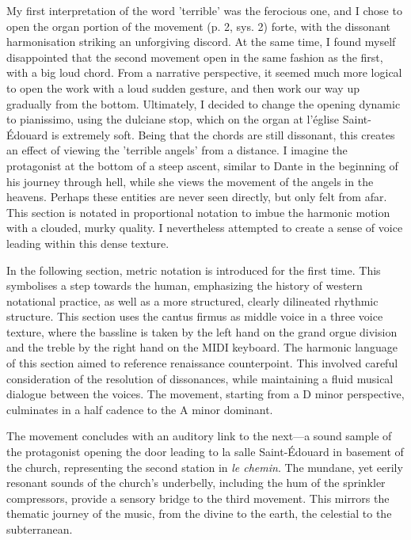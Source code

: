 \documentclass[12pt,twoside,maitrise]{dms_ks}
\theoremstyle{definition}
\begin{document}

My first interpretation of the word 'terrible' was the ferocious one, and I chose to open the organ portion of the movement (p. 2, sys. 2) forte, with the dissonant harmonisation striking an unforgiving discord. 
At the same time, I found myself disappointed that the second movement open in the same fashion as the first, with a big loud chord.
From a narrative perspective, it seemed much more logical to open the work with a loud sudden gesture, and then work our way up gradually from the bottom.
Ultimately, I decided to change the opening dynamic to pianissimo, using the dulciane stop, which on the organ at l'église Saint-Édouard is extremely soft.
Being that the chords are still dissonant, this creates an effect of viewing the 'terrible angels' from a distance. 
I imagine the protagonist at the bottom of a steep ascent, similar to Dante in the beginning of his journey through hell, while she views the movement of the angels in the heavens.
Perhaps these entities are never seen directly, but only felt from afar.
This section is notated in proportional notation to imbue the harmonic motion with a clouded, murky quality.
I nevertheless attempted to create a sense of voice leading within this dense texture.

In the following section, metric notation is introduced for the first time.
This symbolises a step towards the human, emphasizing the history of western notational practice, as well as a more structured, clearly dilineated rhythmic structure. 
This section uses the cantus firmus as middle voice in a three voice texture, where the bassline is taken by the left hand on the grand orgue division and the treble by the right hand on the MIDI keyboard.
The harmonic language of this section aimed to reference renaissance counterpoint.
This involved careful consideration of the resolution of dissonances, while maintaining a fluid musical dialogue between the voices.
The movement, starting from a D minor perspective, culminates in a half cadence to the A minor dominant.


The movement concludes with an auditory link to the next---a sound sample of the protagonist opening the door leading to la salle Saint-Édouard in basement of the church, representing the second station in \textit{le chemin}.
The mundane, yet eerily resonant sounds of the church's underbelly, including the hum of  the sprinkler compressors, provide a sensory bridge to the third movement.
This mirrors the thematic journey of the music, from the divine to the earth, the celestial to the subterranean.
\end{document}
